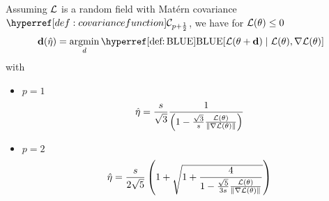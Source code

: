\begin{theorem}
	Assuming \(\mathcal{L}\) is a random field with Matérn covariance
	\(\C_{p+\frac12}\), we have for \(\mathcal{L}(\theta)\le 0\)
	\begin{equation*}
		\step(\hat{\lr})
		= \argmin_{d}
		\BLUE[\Loss(\param + \step) \mid \Loss(\param), \grad\Loss(\param)]
	\end{equation*}
	with
	\begin{itemize}
		\item \(p=1\)
		\begin{equation*}
			\hat{\eta}
			= \frac{s}{\sqrt{3}}\frac{1}{\left(
				1- \frac{\sqrt{3}}{s}\frac{\mathcal{L}(\theta)}{\|\nabla\mathcal{L}(\theta)\|}
			\right)}
		\end{equation*}

		\item \(p=2\)
		\begin{equation*}
			\hat{\eta}
			= \frac{s}{2\sqrt5} \left(
				1 + \sqrt{1+\frac4{1-\frac{\sqrt{5}}{3s}\frac{\mathcal{L}(\theta)}{\|\nabla\mathcal{L}(\theta)\|}}}
			\right)
		\end{equation*}
	\end{itemize}
\end{theorem}
